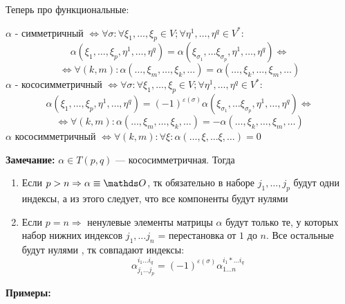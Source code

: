 Теперь про функциональные:

$\alpha$ - симметричный $\Leftrightarrow \forall \sigma: \forall \xi_1,\ldots , \xi_p \in V; \forall \eta^1,\ldots, \eta^q \in V^*: $
$$\alpha(\xi_1,\ldots, \xi_p,\eta^1,\ldots, \eta^q) = \alpha (\xi_{\sigma_1},\ldots \xi_{\sigma_p
}, \eta^1, \ldots, \eta^q) \Leftrightarrow$$
$$\Leftrightarrow \forall (k,m): \alpha(\ldots, \xi_m, \ldots,\xi_k,\ldots) = \alpha (\ldots, \xi_k,\ldots, \xi_m,\ldots)$$
$\alpha$ - кососимметричный $\Leftrightarrow \forall \sigma: \forall \xi_1,\ldots , \xi_p \in V; \forall \eta^1,\ldots, \eta^q \in V^*: $
$$\alpha(\xi_1,\ldots, \xi_p,\eta^1,\ldots, \eta^q) =(-1)^{\varepsilon(\sigma)} \alpha (\xi_{\sigma_1},\ldots \xi_{\sigma_p
}, \eta^1, \ldots, \eta^q) \Leftrightarrow$$
$$\Leftrightarrow \forall (k,m): \alpha(\ldots, \xi_m, \ldots,\xi_k,\ldots) = -\alpha (\ldots, \xi_k,\ldots, \xi_m,\ldots)$$
 $\alpha $ кососимметричный $\Leftrightarrow\forall (k,m):\forall \xi: \alpha(\ldots, \xi, \ldots \xi, \ldots ) = 0$

\textbf{Замечание:} $\alpha \in T(p,q)$ --- кососимметричная. Тогда
\begin{enumerate}
    \item Если $p>n \Rightarrow \alpha \equiv \zero$, тк обязательно в наборе $j_1,\ldots, j_p$ будут одни индексы, а из этого следует, что все компоненты будут нулями
    \item Если $p=n \Rightarrow$ ненулевые элементы матрицы $\alpha$ будут только те, у которых набор нижних индексов $j_1,\ldots j_n$ = перестановка от $1$ до $n$. Все остальные будут нулями , тк совпадают индексы:
    $$\alpha_{j_1\ldots j_p}^{i_1\ldots i_q} = (-1)^{\varepsilon(\sigma)}\alpha_{1\ldots n}^{i_1* \ldots i_q}$$
\end{enumerate}

\textbf{Примеры:}


